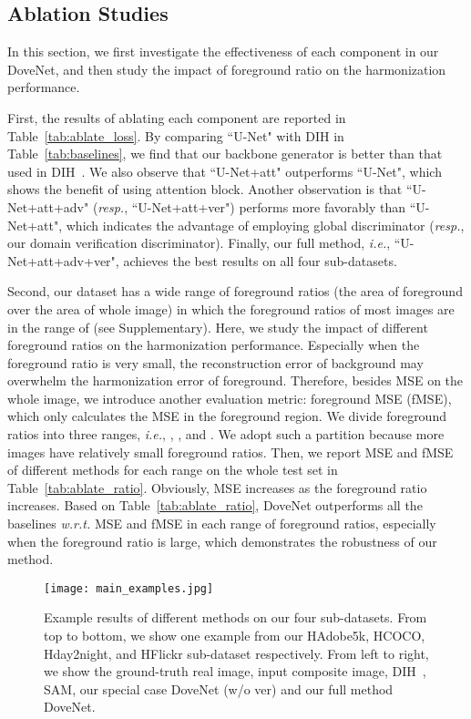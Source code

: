 \documentclass[10pt,twocolumn,letterpaper]{article}
\begin{document}
\subsection{Ablation Studies}
In this section, we first investigate the effectiveness of each component in our DoveNet, and then study the impact of foreground ratio on the harmonization performance.

First, the results of ablating each component are reported in Table~\ref{tab:ablate_loss}. By comparing ``U-Net" with DIH in Table~\ref{tab:baselines}, we find that our backbone generator is better than that used in DIH~\cite{tsai2017deep}. We also observe that ``U-Net+att" outperforms ``U-Net", which shows the benefit of using attention block. Another observation is that ``U-Net+att+adv" (\emph{resp.}, ``U-Net+att+ver") performs more favorably than ``U-Net+att", which indicates the advantage of employing global discriminator (\emph{resp.}, our domain verification discriminator).
Finally, our full method, \emph{i.e.}, ``U-Net+att+adv+ver", achieves the best results on all four sub-datasets.

Second, our dataset has a wide range of foreground ratios (the area of foreground over the area of whole image) in which the foreground ratios of most images are in the range of  (see Supplementary). Here, we study the impact of different foreground ratios on the harmonization performance. Especially when the foreground ratio is very small, the reconstruction error of background may overwhelm the harmonization error of foreground. Therefore, besides MSE on the whole image, we introduce another evaluation metric: foreground MSE (fMSE), which only calculates the MSE in the foreground region. We divide foreground ratios into three ranges, \emph{i.e.}, , , and .
We adopt such a partition because more images have relatively small foreground ratios.
Then, we report MSE and fMSE of different methods for each range on the whole test set in Table~\ref{tab:ablate_ratio}. Obviously, MSE increases as the foreground ratio increases.
Based on Table~\ref{tab:ablate_ratio}, DoveNet outperforms all the baselines \emph{w.r.t.} MSE and fMSE in each range of foreground ratios, especially when the foreground ratio is large, which demonstrates the robustness of our method.


\begin{figure*}[t]
\centering
\texttt{[image: main\_examples.jpg]}
\caption[]{Example results of different methods on our four sub-datasets. From top to bottom, we show one example from our HAdobe5k, HCOCO, Hday2night, and HFlickr sub-dataset respectively. From left to right, we show the ground-truth real image, input composite image, DIH~\cite{tsai2017deep}, SAM\cite{xiaodong2019improving}, our special case DoveNet (w/o ver) and our full method DoveNet.}
\label{fig:samples}
\end{figure*}
\end{document}
